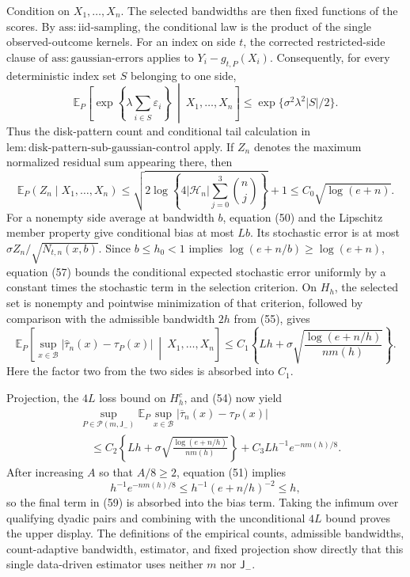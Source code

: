 Condition on \(X_1,\ldots,X_n\). The selected bandwidths are then fixed functions of the scores. By \(\mathrm{ass:iid\text{-}sampling}\), the conditional law is the product of the single observed-outcome kernels. For an index on side \(t\), the corrected restricted-side clause of \(\mathrm{ass:gaussian\text{-}errors}\) applies to \(Y_i-g_{t,P}(X_i)\). Consequently, for every deterministic index set \(S\) belonging to one side,
\[
 \mathbb E_P\!\left[
 \exp\!\left\{\lambda\sum_{i\in S}\varepsilon_i\right\}
 \ \middle|\ X_1,\ldots,X_n\right]
 \le \exp\{\sigma^2\lambda^2|S|/2\}. \tag{56}
\]
Thus the disk-pattern count and conditional tail calculation in \(\mathrm{lem:disk\text{-}pattern\text{-}sub\text{-}gaussian\text{-}control}\) apply. If \(Z_n\) denotes the maximum normalized residual sum appearing there, then
\[
 \mathbb E_P(Z_n\mid X_1,\ldots,X_n)
 \le\sqrt{2\log\!\left\{4|\mathcal H_n|\sum_{j=0}^3\binom nj\right\}}+1
 \le C_0\sqrt{\log(e+n)}. \tag{57}
\]
For a nonempty side average at bandwidth \(b\), equation (50) and the Lipschitz member property give conditional bias at most \(Lb\). Its stochastic error is at most \(\sigma Z_n/\sqrt{N_{t,n}(x,b)}\). Since \(b\le h_0<1\) implies \(\log(e+n/b)\ge\log(e+n)\), equation (57) bounds the conditional expected stochastic error uniformly by a constant times the stochastic term in the selection criterion. On \(H_h\), the selected set is nonempty and pointwise minimization of that criterion, followed by comparison with the admissible bandwidth \(2h\) from (55), gives
\[
 \mathbb E_P\!\left[
 \sup_{x\in\mathcal B}|\widehat\tau_n(x)-\tau_P(x)|
 \ \middle|\ X_1,\ldots,X_n\right]
 \le C_1\left\{Lh+\sigma\sqrt{\frac{\log(e+n/h)}{nm(h)}}\right\}. \tag{58}
\]
Here the factor two from the two sides is absorbed into \(C_1\).

Projection, the \(4L\) loss bound on \(H_h^c\), and (54) now yield
\[
 \begin{aligned}
 &\sup_{P\in\mathcal P(m,\mathsf J_{-})}
 \mathbb E_P\sup_{x\in\mathcal B}|\overline\tau_n(x)-\tau_P(x)|\\
 &\quad\le C_2\left\{Lh+\sigma\sqrt{\frac{\log(e+n/h)}{nm(h)}}\right\}
 +C_3Lh^{-1}e^{-nm(h)/8}.
 \end{aligned} \tag{59}
\]
After increasing \(A\) so that \(A/8\ge2\), equation (51) implies
\[
 h^{-1}e^{-nm(h)/8}
 \le h^{-1}(e+n/h)^{-2}
 \le h,
\]
so the final term in (59) is absorbed into the bias term. Taking the infimum over qualifying dyadic pairs and combining with the unconditional \(4L\) bound proves the upper display. The definitions of the empirical counts, admissible bandwidths, count-adaptive bandwidth, estimator, and fixed projection show directly that this single data-driven estimator uses neither \(m\) nor \(\mathsf J_{-}\).

